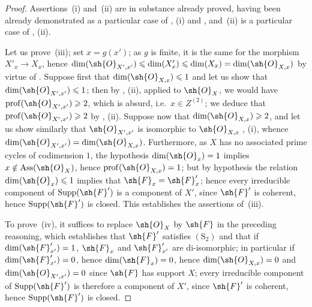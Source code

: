 \begin{proof}
Assertions~(i) and~(ii) are in substance already proved, having been already demonstrated as a particular case of , (i) and , and~(ii) is a particular case of , (ii).

Let us prove~(iii); set $x=g(x')$; as $g$ is finite, it is the same for the morphism $X'_x\to X_x$, hence $\dim(\sh{O}_{X',x'})\leqslant\dim(X'_x)\leqslant\dim(X_x)=\dim(\sh{O}_{X,x})$ by virtue of .
Suppose first that $\dim(\sh{O}_{X,x})\leqslant 1$ and let us show that $\dim(\sh{O}_{X',x'})\leqslant 1$; then by , (ii), applied to $\sh{O}_X$, we would have $\operatorname{prof}(\sh{O}_{X',x'})\geqslant 2$, which is absurd, i.e.\ $x\in Z^{(2)}$; we deduce that $\operatorname{prof}(\sh{O}_{X',x'})\geqslant 2$ by , (ii).
Suppose now that $\dim(\sh{O}_{X,x})\geqslant 2$, and let us show similarly that $\sh{O}_{X',x'}$ is isomorphic to $\sh{O}_{X,x}$ , (i), whence $\dim(\sh{O}_{X',x'})=\dim(\sh{O}_{X,x})$.
Furthermore, as $X$ has no associated prime cycles of codimension $1$, the hypothesis $\dim(\sh{O}_x)=1$ implies $x\notin\operatorname{Ass}(\sh{O}_X)$, hence $\operatorname{prof}(\sh{O}_{X,x})=1$; but by hypothesis the relation $\dim(\sh{O}_x)\leqslant 1$ implies that $\sh{F}_x=\sh{F}'_x$; hence every irreducible component of $\operatorname{Supp}(\sh{F}')$ is a component of $X'$, since $\sh{F}'$ is coherent, hence $\operatorname{Supp}(\sh{F}')$ is closed.
This establishes the assertions of~(iii).


To prove~(iv), it suffices to replace $\sh{O}_X$ by $\sh{F}$ in the preceding reasoning, which establishes that $\sh{F}'$ satisfies $(\mathrm{S}_2)$ and that if $\dim(\sh{F}'_{x'})=1$, $\sh{F}_x$ and $\sh{F}'_{x'}$ are di-isomorphic; in particular if $\dim(\sh{F}'_{x'})=0$, hence $\dim(\sh{F}_x)=0$, hence $\dim(\sh{O}_{X,x})=0$ and $\dim(\sh{O}_{X',x'})=0$ since $\sh{F}$ has support $X$; every irreducible component of $\operatorname{Supp}(\sh{F}')$ is therefore a component of $X'$, since $\sh{F}'$ is coherent, hence $\operatorname{Supp}(\sh{F}')$ is closed.
\end{proof}


